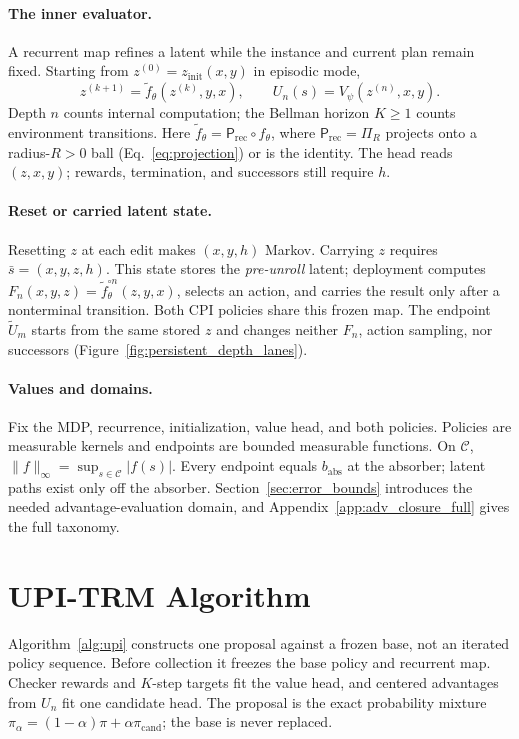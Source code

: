 \documentclass{article}
\theoremstyle{plain}
\theoremstyle{definition}
\theoremstyle{remark}
\begin{document}
\paragraph{The inner evaluator.}
A recurrent map refines a latent while the instance and current plan remain
fixed. Starting from $z^{(0)}=z_{\mathrm{init}}(x,y)$ in episodic mode,
\[
z^{(k+1)}=\widetilde f_\theta(z^{(k)},y,x),\qquad
U_n(s)=V_\psi(z^{(n)},x,y).
\]
Depth $n$ counts internal computation; the Bellman horizon $K\ge1$ counts
environment transitions. Here $\widetilde f_\theta=\mathsf P_{\mathrm{rec}}\circ
f_\theta$, where $\mathsf P_{\mathrm{rec}}=\Pi_R$ projects onto a radius-$R>0$
ball (Eq.~\eqref{eq:projection}) or is the identity. The head reads $(z,x,y)$;
rewards, termination, and successors still require $h$.

\paragraph{Reset or carried latent state.}
Resetting $z$ at each edit makes $(x,y,h)$ Markov. Carrying $z$ requires
$\bar s=(x,y,z,h)$. This state stores the \emph{pre-unroll} latent; deployment
computes $F_n(x,y,z)=\widetilde f_\theta^{\circ n}(z,y,x)$, selects an action,
and carries the result only after a nonterminal transition. Both CPI policies
share this frozen map. The endpoint $\widetilde U_m$ starts from the same stored
$z$ and changes neither $F_n$, action sampling, nor successors
(Figure~\ref{fig:persistent_depth_lanes}).



\paragraph{Values and domains.}
Fix the MDP, recurrence, initialization, value head, and both policies. Policies
are measurable kernels and endpoints are bounded measurable functions. On
$\mathcal C$, $\|f\|_\infty=\sup_{s\in\mathcal C}|f(s)|$. Every endpoint equals
$b_{\mathrm{abs}}$ at the absorber; latent paths exist only off the absorber.
Section~\ref{sec:error_bounds} introduces the needed advantage-evaluation
domain, and Appendix~\ref{app:adv_closure_full} gives the full taxonomy.

\section{UPI-TRM Algorithm}
\label{sec:algorithm}
Algorithm~\ref{alg:upi} constructs one proposal against a frozen base, not an
iterated policy sequence. Before collection it freezes the base policy and
recurrent map. Checker rewards and $K$-step targets fit the value head, and
centered advantages from $U_n$ fit one candidate head. The proposal is the exact
probability mixture $\pi_\alpha=(1-\alpha)\pi+\alpha\pi_{\mathrm{cand}}$; the
base is never replaced.
\end{document}

